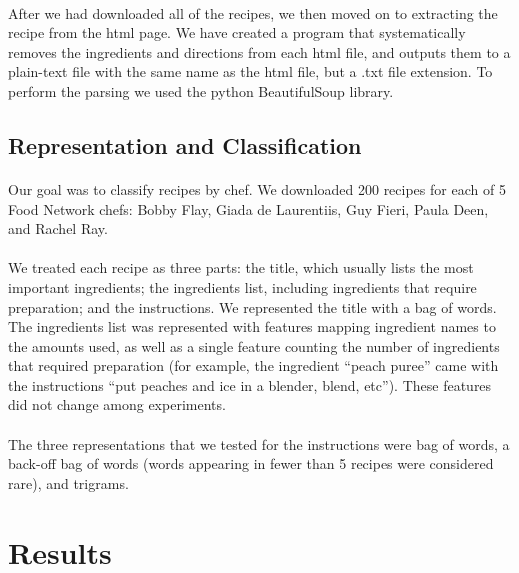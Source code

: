 \documentclass[paper=a4, fontsize=11pt]{scrartcl} %
\begin{document}
\paragraph{}
After we had downloaded all of the recipes, we then moved on to extracting the recipe from the html page.  We have created a program that systematically removes the ingredients and directions from each html file, and outputs them to a plain-text file with the same name as the html file, but a .txt file extension.  To perform the parsing we used the python BeautifulSoup library.

\subsection{Representation and Classification}

\paragraph{}
Our goal was to classify recipes by chef.  
We downloaded 200 recipes for each of 5 Food Network chefs: Bobby Flay, Giada de Laurentiis, Guy Fieri, Paula Deen, and Rachel Ray.  

\paragraph{}
We treated each recipe as three parts: the title, which usually lists the most important ingredients; the ingredients list, including ingredients that require preparation; and the instructions.  We represented the title with a bag of words.  The ingredients list was represented with features mapping ingredient names to the amounts used, as well as a single feature counting the number of ingredients that required preparation (for example, the ingredient ``peach puree'' came with the instructions ``put peaches and ice in a blender, blend, etc'').  These features did not change among experiments.

\paragraph{}
The three representations that we tested for the instructions were bag of words, a back-off bag of words (words appearing in fewer than 5 recipes were considered rare), and trigrams.  

\section{Results}
\end{document}
